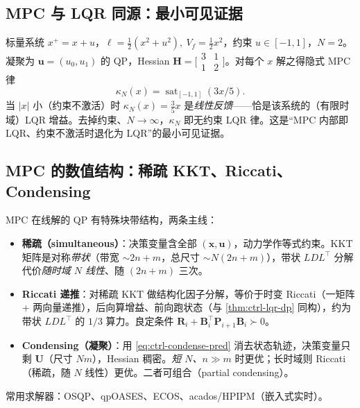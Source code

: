 \subsection{MPC 与 LQR 同源：最小可见证据}
\label{sec:ctrl-mpc-lqr}

\begin{example}[约束不激活时 MPC = LQR]
\label{ex:ctrl-mpc-eq-lqr}
 标量系统 $x^+=x+u$，$\ell=\tfrac12(x^2+u^2),\ V_f=\tfrac12x^2$，约束 $u\in[-1,1]$，$N=2$。凝聚为 $\mathbf{u}=(u_0,u_1)$ 的 QP，Hessian $\mathbf{H}=\big[\begin{smallmatrix}3&1\\1&2\end{smallmatrix}\big]$。对每个 $x$ 解之得隐式 MPC 律
\[
  \kappa_N(x)=\operatorname{sat}_{[-1,1]}(3x/5).
\]
当 $|x|$ 小（约束不激活）时 $\kappa_N(x)=\tfrac35x$ 是\emph{线性反馈}——恰是该系统的（有限时域）LQR 增益。去掉约束、$N\to\infty$，$\kappa_N$ 即无约束 LQR 律。这是“MPC 内部即 LQR、约束不激活时退化为 LQR”的最小可见证据。
\end{example}

\subsection{MPC 的数值结构：稀疏 KKT、Riccati、Condensing}
\label{sec:ctrl-mpc-numerical}

MPC 在线解的 QP 有特殊块带结构，两条主线\cite{rawlings2020mpc}：
\begin{itemize}
  \item \textbf{稀疏（simultaneous）}：决策变量含全部 $(\mathbf{x},\mathbf{u})$，动力学作等式约束。KKT 矩阵是对称\emph{带状}（带宽 $\sim2n+m$，总尺寸 $\sim N(2n+m)$），带状 $LDL^\top$ 分解代价\emph{随时域 $N$ 线性}、随 $(2n+m)$ 三次。
  \item \textbf{Riccati 递推}：对稀疏 KKT 做结构化因子分解，等价于时变 Riccati（一矩阵 + 两向量递推），后向算增益、前向跑状态（与 \cref{thm:ctrl-lqr-dp} 同构），约为带状 $LDL^\top$ 的 $1/3$ 算力。良定条件 $\mathbf{R}_i+\mathbf{B}_i^\top\mathbf{P}_{i+1}\mathbf{B}_i\succ0$。
  \item \textbf{Condensing（凝聚）}：用 \cref{eq:ctrl-condense-pred} 消去状态轨迹，决策变量只剩 $\mathbf{U}$（尺寸 $Nm$），Hessian 稠密。\emph{短 $N$、$n\gg m$} 时更优；长时域则 Riccati（稀疏，随 $N$ 线性）更优。二者可组合（partial condensing）。
\end{itemize}
常用求解器：OSQP、qpOASES、ECOS、acados/HPIPM（嵌入式实时）。


